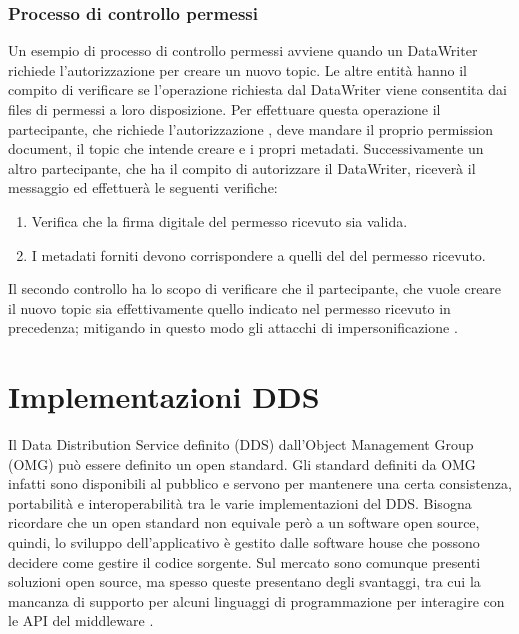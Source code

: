 \subsubsection{Processo di controllo permessi}
Un esempio di processo di controllo permessi avviene
quando un DataWriter richiede l'autorizzazione per creare un nuovo topic.
Le altre entità hanno il compito di verificare se l'operazione 
richiesta dal DataWriter viene consentita
dai files di permessi a loro disposizione. Per effettuare 
questa operazione il partecipante, che richiede l'autorizzazione ,
deve mandare il proprio permission document, il topic che intende creare e 
i propri metadati. Successivamente un altro partecipante,
che ha il compito di autorizzare il DataWriter,
riceverà il messaggio ed effettuerà le seguenti
verifiche:
\begin{enumerate}
    \item Verifica che la firma digitale del permesso ricevuto sia valida.
    \item I metadati forniti devono corrispondere a quelli del del 
    permesso ricevuto.
\end{enumerate}
Il secondo controllo ha lo scopo di verificare
che il partecipante, che vuole creare il 
nuovo topic sia effettivamente quello indicato nel permesso 
ricevuto in precedenza; mitigando in questo modo gli attacchi di 
impersonificazione 
\cite{DBLP:conf/asiaccs/WangLG24}.

\section{Implementazioni DDS}
Il Data Distribution Service definito (DDS) dall'Object Management
Group (OMG) può essere definito un open standard. Gli standard
definiti da OMG infatti sono disponibili al pubblico e servono  
per mantenere una certa consistenza, portabilità e interoperabilità
tra le varie implementazioni del DDS. Bisogna ricordare che un open 
standard non equivale però a un software open source, quindi, lo
sviluppo dell'applicativo è gestito dalle software house che possono 
decidere come gestire il codice sorgente. Sul mercato sono comunque 
presenti
soluzioni open source, ma spesso queste presentano degli svantaggi,
tra cui la mancanza di supporto per alcuni linguaggi di programmazione 
per interagire con le API del middleware
\cite{DDSimplementationRTI}.




